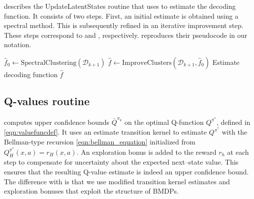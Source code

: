 \documentclass[11pt]{article}
\newcommand{\mcD}{\mathcal{D}}
\theoremstyle{definition}
\theoremstyle{definition}
\begin{document}
 describes the UpdateLatentStates routine that  uses to estimate the decoding function.
It consists of two steps.
First, an initial estimate is obtained using a spectral method.
This is subsequently refined in an iterative improvement step.
These steps correspond to \cite[Algorithm 1]{Jedra:2022} and \cite[Algorithm 2]{Jedra:2022}, respectively.
 reproduces their pseudocode in our notation.

\begin{algorithm}
	\begin{algorithmic}[1]
		\Procedure{UpdateLatentStates}{$\mcD_{k+1}$}
		\State $\hat{f}_0\gets \text{SpectralClustering}(\mcD_{k+1})$ 
		\State $\hat{f}\gets \text{ImproveClusters}(\mcD_{k+1},\hat{f}_0)$ 
		\State \Return Estimate decoding function $\hat{f}$
		\EndProcedure
	\end{algorithmic}
	\caption{Pseudocode for estimating the decoding function.}
	\label{alg:UpdateLatentStates}
\end{algorithm}

\subsection{Q-values routine}
\label{sec:Q-values_routine}

 computes upper confidence bounds $\bar{Q}^{\pi_k}$ on the optimal Q-function $Q^{\pi^*}$, defined in \eqref{eqn:valuefuncdef}.
It uses an estimate transition kernel to estimate $Q^{\pi^*}$ with the Bellman-type recursion \eqref{eqn:bellman_equation} initialized from $Q^{\pi^*}_H(x,a)=r_H(x,a)$.
An exploration bonus is added to the reward $r_h$ at each step to compensate for uncertainty about the expected next--state value.
This ensures that the resulting Q-value estimate is indeed an upper confidence bound.
The difference with \cite{UCRLVI} is that we use modified transition kernel estimates and exploration bonuses that exploit the structure of \glspl{BMDP}.
\end{document}
